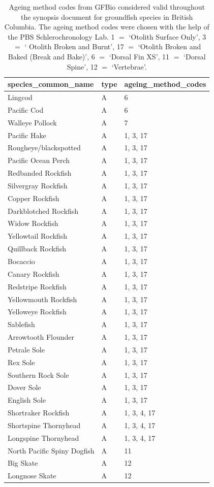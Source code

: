 \documentclass[11pt]{book}\usepackage[]{graphicx}\usepackage[]{color}
\begin{document}
\begin{table}[ht]
\centering
\caption{Ageing method codes from GFBio considered valid throughout the synopsis document for groundfish species in British Columbia. The ageing method codes were chosen with the help of the PBS Schlerochronology Lab. 1 $=$ `Otolith Surface Only', 3 $=$ ` Otolith Broken and Burnt', 17 $=$ `Otolith Broken and Baked (Break and Bake)', 6 $=$ `Dorsal Fin XS', 11 $=$ `Dorsal Spine', 12 $=$ `Vertebrae'.} 
\begin{tabular}{lll}
  \toprule
species_common_name & type & ageing_method_codes \\ 
  \midrule
Lingcod & A & 6 \\ 
  Pacific Cod & A & 6 \\ 
  Walleye Pollock & A & 7 \\ 
  Pacific Hake & A & 1, 3, 17 \\ 
  Rougheye/blackspotted  & A & 1, 3, 17 \\ 
  Pacific Ocean Perch & A & 1, 3, 17 \\ 
  Redbanded Rockfish & A & 1, 3, 17 \\ 
  Silvergray Rockfish & A & 1, 3, 17 \\ 
  Copper Rockfish & A & 1, 3, 17 \\ 
  Darkblotched Rockfish & A & 1, 3, 17 \\ 
  Widow Rockfish & A & 1, 3, 17 \\ 
  Yellowtail Rockfish & A & 1, 3, 17 \\ 
  Quillback Rockfish & A & 1, 3, 17 \\ 
  Bocaccio & A & 1, 3, 17 \\ 
  Canary Rockfish & A & 1, 3, 17 \\ 
  Redstripe Rockfish & A & 1, 3, 17 \\ 
  Yellowmouth Rockfish & A & 1, 3, 17 \\ 
  Yelloweye Rockfish & A & 1, 3, 17 \\ 
  Sablefish & A & 1, 3, 17 \\ 
  Arrowtooth Flounder & A & 1, 3, 17 \\ 
  Petrale Sole & A & 1, 3, 17 \\ 
  Rex Sole & A & 1, 3, 17 \\ 
  Southern Rock Sole & A & 1, 3, 17 \\ 
  Dover Sole & A & 1, 3, 17 \\ 
  English Sole & A & 1, 3, 17 \\ 
  Shortraker Rockfish & A & 1, 3, 4, 17 \\ 
  Shortspine Thornyhead & A & 1, 3, 4, 17 \\ 
  Longspine Thornyhead & A & 1, 3, 4, 17 \\ 
  North Pacific Spiny Dogfish & A & 11 \\ 
  Big Skate & A & 12 \\ 
  Longnose Skate & A & 12 \\ 
   \bottomrule
\end{tabular}
\end{table}
\end{document}
